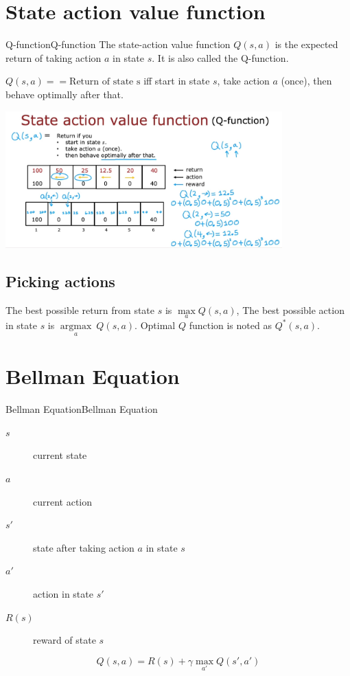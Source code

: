 \section{State action value function}
\begin{dfnbox}{Q-function}{Q-function}
    \hspace*{2em}The state-action value function $Q(s, a)$ is the expected return of taking action $a$ in state $s$.
    It is also called the Q-function.
    
    \hspace*{2em}$Q(s, a) == \text{Return of state s}$ iff start in state $s$, take action $a$ (once), then behave optimally after that.\\
    \begin{center}
    \includegraphics*[width=0.8\textwidth]{images/17.5}
    \end{center}
\end{dfnbox}
\subsection*{Picking actions}
The best possible return from state $s$ is $\max \limits_{a} Q(s, a)$,
The best possible action in state $s$ is $\mathop{\mathrm{argmax}} \limits_{a} \ Q(s, a)$.
Optimal $Q$ function is noted as $Q^*(s, a)$.

\section{Bellman Equation}
\begin{thmbox}{Bellman Equation}{Bellman Equation}
    \begin{description}
        \item[$s$] current state
        \item[$a$] current action
        \item[$s'$] state after taking action $a$ in state $s$
        \item[$a'$] action in state $s'$
        \item[$R(s)$] reward of state $s$ 
    \end{description}
    \begin{equation}
        Q(s, a) = R(s) + \gamma \max \limits_{a'} Q(s', a')
    \end{equation}
\end{thmbox}
